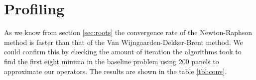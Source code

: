 \documentclass[a4paper, oneside]{thirdparty_stylesheets/discothesis}
\begin{document}
\section{Profiling}
As we know from section \ref{sec:roots} the convergence rate of the Newton-Raphson method is faster than that of the Van Wijngaarden-Dekker-Brent method.
We could confirm this by checking the amount of iteration the algorithms took to find the first eight minima in the baseline problem using 200 panels to approximate our operators.
The results are shown in the table \ref{tbl:conv}.
\begin{table}[H]
	\centering
	\caption{Steps taken until convergence for first eight minima found on our baseline problem.}
	\label{tbl:conv}
\end{table}
\end{document}
